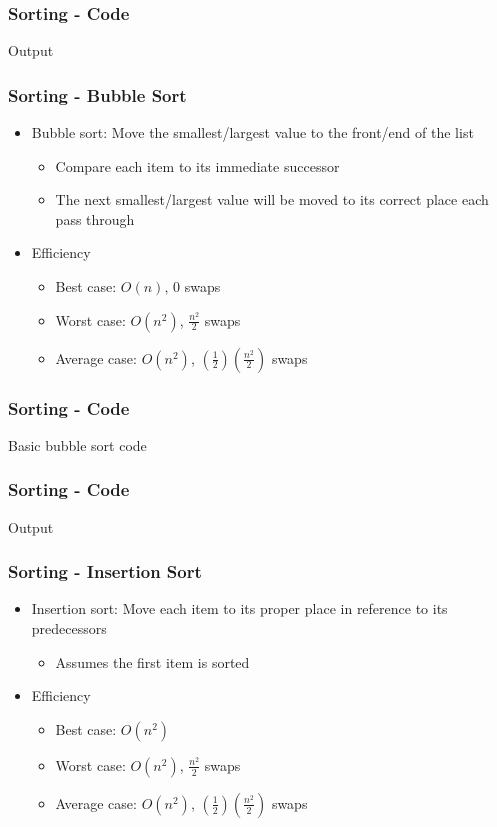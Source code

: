 \begin{frame}\frametitle{Sorting - Code}
Output

\end{frame}

\begin{frame}\frametitle{Sorting - Bubble Sort}
\begin{itemize}
\item Bubble sort: Move the smallest/largest value to the front/end of the list
	\begin{itemize}
	\item Compare each item to its immediate successor
	\item The next smallest/largest value will be moved to its correct place each pass through
	\end{itemize}
\item Efficiency
	\begin{itemize}
	\item Best case: $O(n)$, $0$ swaps
	\item Worst case: $O(n^2)$, $\frac{n^2}{2}$ swaps
	\item Average case: $O(n^2)$, $(\frac{1}{2})(\frac{n^2}{2})$ swaps
	\end{itemize}
\end{itemize}
\end{frame}

\begin{frame}\frametitle{Sorting - Code}
Basic bubble sort code

\end{frame}

\begin{frame}\frametitle{Sorting - Code}
Output

\end{frame}

\begin{frame}\frametitle{Sorting - Insertion Sort}
\begin{itemize}
\item Insertion sort: Move each item to its proper place in reference to its predecessors
	\begin{itemize}
	\item Assumes the first item is sorted
	\end{itemize}
\item Efficiency
	\begin{itemize}
	\item Best case: $O(n^2)$
	\item Worst case: $O(n^2)$, $\frac{n^2}{2}$ swaps
	\item Average case: $O(n^2)$, $(\frac{1}{2})(\frac{n^2}{2})$ swaps
	\end{itemize}
\end{itemize}
\end{frame}

